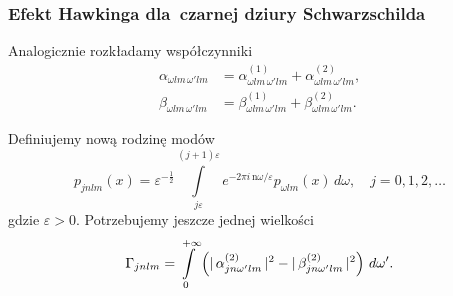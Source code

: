 \documentclass[10pt,t]{beamer}
\begin{document}
\begin{frame}
  \frametitle{Efekt Hawkinga dla~czarnej dziury Schwarzschilda}


  Analogicznie rozkładamy współczynniki
  \begin{subequations}
    \begin{align}
      \label{eq:Promieniowanie-Hawkinga-45-A}
      \alpha_{ \omega l m\, \omega' l m }
      &= \alpha_{ \omega l m\, \omega' l m }^{ ( 1 ) }
        + \alpha_{ \omega l m\, \omega' l m }^{ ( 2 ) }, \\
      \label{eq:HawkingPromieniowanie-45-B}
      \beta_{ \omega l m\, \omega' l m }
      &= \beta_{ \omega l m\, \omega' l m }^{ ( 1 ) }
        + \beta_{ \omega l m\, \omega' l m }^{ ( 2 ) }.
    \end{align}
  \end{subequations}


  Definiujemy nową rodzinę modów
  \begin{equation}
    \label{eq:HawkingPromieniowanie-46}
    p_{ j n l m }( x ) =
    \varepsilon^{ -\frac{ 1 }{ 2 } } \int\limits_{ j \varepsilon }^{ ( j + 1 ) \varepsilon }
    e^{ -2 \pi i\, \mathrm{n} \omega / \varepsilon } p_{ \omega l m }( x ) \, d \omega,
    \quad j = 0, 1, 2, \ldots
  \end{equation}
  gdzie $\varepsilon > 0$. Potrzebujemy jeszcze jednej wielkości
  \begin{equation}
    \label{eq:HawkingPromieniowanie-47}
    \Gamma_{ j n lm } =
    \int\limits_{ 0 }^{ +\infty }
    \left( |\, {  \alpha_{ j n \omega' l m }^{ ( 2 ) }  } \,|^{ 2 }
      - |\, {  \beta_{ j n \omega' l m }^{ ( 2 ) }  } \,|^{ 2 } \right) \, d \omega'.
  \end{equation}

\end{frame}
\end{document}
